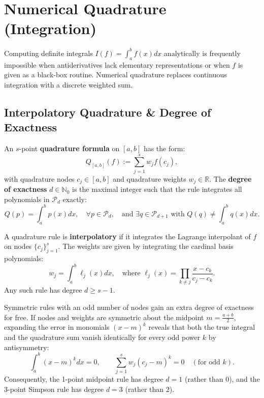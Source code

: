 \section{Numerical Quadrature (Integration)}

Computing definite integrals $I(f) = \int_{a}^{b} f(x) dx$ analytically is frequently impossible when antiderivatives lack elementary representations or when $f$ is given as a black-box routine. Numerical quadrature replaces continuous integration with a discrete weighted sum.

\subsection{Interpolatory Quadrature \& Degree of Exactness}

\begin{definition}
    An $s$-point \textbf{quadrature formula} on $[a, b]$ has the form:
    \begin{equation}
        Q_{[a, b]}(f) := \sum_{j=1}^{s} w_j f(c_j),
    \end{equation}
    with quadrature nodes $c_j \in [a, b]$ and quadrature weights $w_j \in \mathbb{R}$.
    The \textbf{degree of exactness} $d \in \mathbb{N}_0$ is the maximal integer such that the rule integrates all polynomials in $\mathcal{P}_d$ exactly:
    \begin{equation}
        Q(p) = \int_{a}^{b} p(x) dx, \quad \forall p \in \mathcal{P}_d, \quad \text{and } \exists q \in \mathcal{P}_{d+1} \text{ with } Q(q) \neq \int_{a}^{b} q(x) dx.
    \end{equation}
\end{definition}

A quadrature rule is \textbf{interpolatory} if it integrates the Lagrange interpolant of $f$ on nodes $\{c_j\}_{j=1}^s$. The weights are given by integrating the cardinal basis polynomials:
\begin{equation}
    w_j = \int_{a}^{b} \ell_j(x) dx, \quad \text{where } \ell_j(x) = \prod_{k \neq j} \frac{x - c_k}{c_j - c_k}.
\end{equation}
Any such rule has degree $d \ge s - 1$.

Symmetric rules with an odd number of nodes gain an extra degree of exactness for free. If nodes and weights are symmetric about the midpoint $m = \frac{a+b}{2}$, expanding the error in monomials $(x - m)^k$ reveals that both the true integral and the quadrature sum vanish identically for every odd power $k$ by antisymmetry:
\begin{equation}
    \int_{a}^{b} (x - m)^k dx = 0, \qquad \sum_{j=1}^{s} w_j (c_j - m)^k = 0 \quad (\text{for odd } k).
\end{equation}
Consequently, the 1-point midpoint rule has degree $d = 1$ (rather than $0$), and the 3-point Simpson rule has degree $d = 3$ (rather than $2$).

